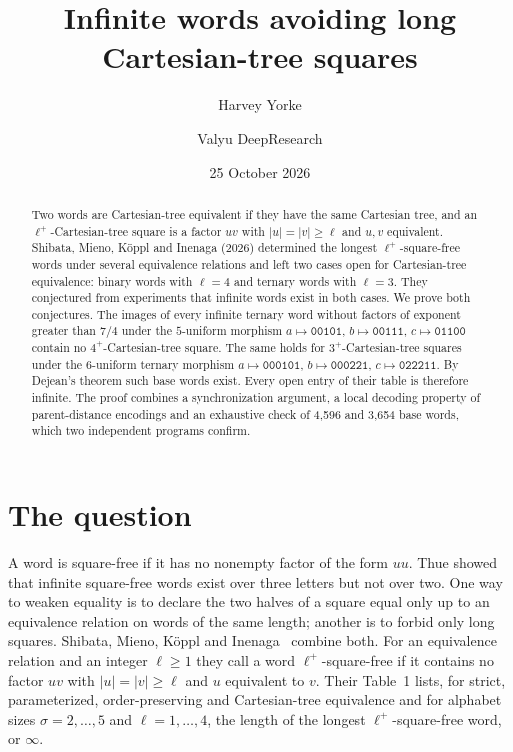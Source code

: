 \documentclass[11pt]{amsart}
\title{Infinite words avoiding long Cartesian-tree squares}
\author{Harvey Yorke}
\author{Valyu DeepResearch}
\date{25 October 2026}
\theoremstyle{definition}
\theoremstyle{remark}
\newcommand{\tw}{\mathtt}
\begin{document}
\raggedbottom
\begin{abstract}
Two words are Cartesian-tree equivalent if they have the same Cartesian tree, and an $\ell^+$-Cartesian-tree square is a factor $uv$ with $|u|=|v|\ge\ell$ and $u,v$ equivalent. Shibata, Mieno, K\"oppl and Inenaga (2026) determined the longest $\ell^+$-square-free words under several equivalence relations and left two cases open for Cartesian-tree equivalence: binary words with $\ell=4$ and ternary words with $\ell=3$. They conjectured from experiments that infinite words exist in both cases. We prove both conjectures. The images of every infinite ternary word without factors of exponent greater than $7/4$ under the $5$-uniform morphism $a\mapsto \tw{00101}$, $b\mapsto\tw{00111}$, $c\mapsto\tw{01100}$ contain no $4^+$-Cartesian-tree square. The same holds for $3^+$-Cartesian-tree squares under the $6$-uniform ternary morphism $a\mapsto\tw{000101}$, $b\mapsto\tw{000221}$, $c\mapsto\tw{022211}$. By Dejean's theorem such base words exist. Every open entry of their table is therefore infinite. The proof combines a synchronization argument, a local decoding property of parent-distance encodings and an exhaustive check of 4{,}596 and 3{,}654 base words, which two independent programs confirm.
\end{abstract}
\maketitle

\section{The question}

A word is square-free if it has no nonempty factor of the form $uu$. Thue showed that infinite square-free words exist over three letters but not over two. One way to weaken equality is to declare the two halves of a square equal only up to an equivalence relation on words of the same length; another is to forbid only long squares. Shibata, Mieno, K\"oppl and Inenaga~\cite{SMKI2026} combine both. For an equivalence relation and an integer $\ell\ge1$ they call a word $\ell^+$-square-free if it contains no factor $uv$ with $|u|=|v|\ge\ell$ and $u$ equivalent to $v$. Their Table~1 lists, for strict, parameterized, order-preserving and Cartesian-tree equivalence and for alphabet sizes $\sigma=2,\dots,5$ and $\ell=1,\dots,4$, the length of the longest $\ell^+$-square-free word, or $\infty$.
\end{document}
